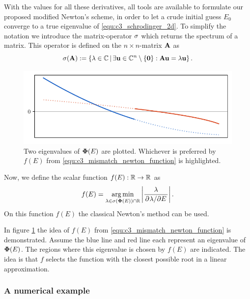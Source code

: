With the values for all these derivatives, all tools are available to formulate our proposed modified Newton's scheme, in order to let a crude initial guess $E_0$ converge to a true eigenvalue of \eqref{equ:c3_schrodinger_2d}. To simplify the notation we introduce the matrix-operator $\operatorname{\sigma}$ which returns the spectrum of a matrix. This operator is defined on the $n \times n$-matrix $\vb{A}$ as
$$
  \operatorname{\sigma}(\vb{A}) := \left\{\lambda \in \mathbb{C} \, \middle| \, \exists \vb{u} \in \mathbb{C}^n \setminus \{\vb{0}\} : \vb{A} \vb{u} = \lambda \vb{u} \right\}\text{.}
$$

\begin{figure}
  \begin{center}
    \includegraphics[width=\textwidth]{img/chapter3/select_lambda_newton.pdf}
  \end{center}
  \caption{Two eigenvalues of $\vb{\Phi}(E)$ are plotted. Whichever is preferred by $f(E)$ from \eqref{equ:c3_mismatch_newton_function} is highlighted.}\label{fig:c3_select_lambda_newton}
\end{figure}

Now, we define the scalar function $f(E) : \mathbb{R} \to \mathbb{R}$ as
\begin{equation}\label{equ:c3_mismatch_newton_function}
  f(E) = \operatorname*{arg\,min}_{\lambda \in \operatorname{\sigma}(\vb{\Phi}(E)) \cap \mathbb{R}} \left|\frac{\lambda}{\pdv*[]{\lambda}{E}}\right|\text{.}
\end{equation}
On this function $f(E)$ the classical Newton's method can be used.

In figure \ref{fig:c3_select_lambda_newton} the idea of $f(E)$ from \eqref{equ:c3_mismatch_newton_function} is demonstrated. Assume the blue line and red line each represent an eigenvalue of $\vb{\Phi}(E)$. The regions where this eigenvalue is chosen by $f(E)$ are indicated. The idea is that $f$ selects the function with the closest possible root in a linear approximation.

\subsubsection{A numerical example}

